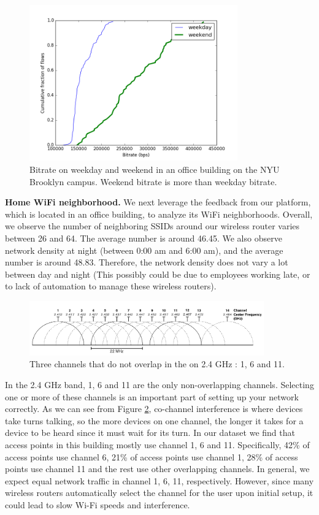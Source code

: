 \begin{figure}
\centering
\includegraphics[width=0.8\textwidth]{figure/bitrate(weekday_vs_weekend).png}
\caption{Bitrate on weekday and weekend in an office building on the NYU Brooklyn campus. Weekend bitrate is more than weekday bitrate.} 
\label{fig:compare}
\end{figure}

\textbf{Home WiFi neighborhood.} We next leverage the feedback from our platform, which is located in an office building, to analyze its WiFi neighborhoods. Overall, we observe the number of neighboring SSIDs around our wireless router varies between 26 and 64. The average number is around 46.45. We also observe network density at night (between 0:00 am and 6:00 am), and the average number is around 48.83. Therefore, the network density does not vary a lot between day and night (This possibly could be due to employees working late, or to lack of automation to manage these wireless routers).

\begin{figure}
\centering
\includegraphics[width=0.9\textwidth]{figure/2GHz_WiFi_channels.png}
\caption{Three channels that do not overlap in the on 2.4 GHz : 1, 6 and 11\cite{wlanchannels}.} 
\label{fig:channels}
\end{figure}

In the 2.4 GHz band, 1, 6 and 11 are the only non-overlapping channels. Selecting one or more of these channels is an important part of setting up your network correctly. As we can see from Figure \ref{fig:channels}, co-channel interference is where devices take turns talking, so the more devices on one channel, the longer it takes for a device to be heard since it must wait for its turn. In our dataset we find that access points in this building mostly use channel 1, 6 and 11. Specifically, 42\% of access points use channel 6, 21\% of access points use channel 1, 28\% of access points use channel 11 and the rest use other overlapping channels. In general, we expect equal network traffic in channel 1, 6, 11, respectively. However, since many wireless routers automatically select the channel for the user upon initial setup, it could lead to slow Wi-Fi speeds and interference. 


